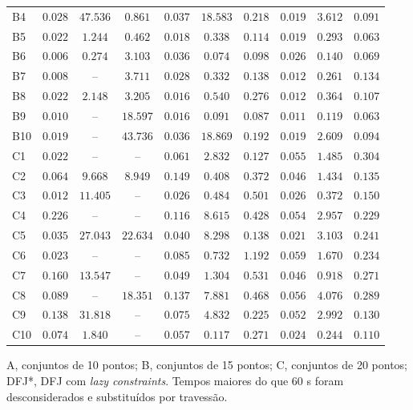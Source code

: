 \begin{table}
\begin{threeparttable}
\begin{tabular}{lccccccccc}
B4 & $\mathbf{0.028}$ & $47.536$ & $0.861$ & $\mathbf{0.037}$ & $18.583$ & $0.218$ & $\mathbf{0.019}$ & $3.612$ & $0.091$\\
B5 & $\mathbf{0.022}$ & $1.244$ & $0.462$ & $\mathbf{0.018}$ & $0.338$ & $0.114$ & $\mathbf{0.019}$ & $0.293$ & $0.063$\\
B6 & $\mathbf{0.006}$ & $0.274$ & $3.103$ & $\mathbf{0.036}$ & $0.074$ & $0.098$ & $\mathbf{0.026}$ & $0.140$ & $0.069$\\
B7 & $\mathbf{0.008}$ & -- & $3.711$ & $\mathbf{0.028}$ & $0.332$ & $0.138$ & $\mathbf{0.012}$ & $0.261$ & $0.134$\\
B8 & $\mathbf{0.022}$ & $2.148$ & $3.205$ & $\mathbf{0.016}$ & $0.540$ & $0.276$ & $\mathbf{0.012}$ & $0.364$ & $0.107$\\
B9 & $\mathbf{0.010}$ & -- & $18.597$ & $\mathbf{0.016}$ & $0.091$ & $0.087$ & $\mathbf{0.011}$ & $0.119$ & $0.063$\\
B10 & $\mathbf{0.019}$ & -- & $43.736$ & $\mathbf{0.036}$ & $18.869$ & $0.192$ & $\mathbf{0.019}$ & $2.609$ & $0.094$\\
C1 & $\mathbf{0.022}$ & -- & -- & $\mathbf{0.061}$ & $2.832$ & $0.127$ & $\mathbf{0.055}$ & $1.485$ & $0.304$\\
C2 & $\mathbf{0.064}$ & $9.668$ & $8.949$ & $\mathbf{0.149}$ & $0.408$ & $0.372$ & $\mathbf{0.046}$ & $1.434$ & $0.135$\\
C3 & $\mathbf{0.012}$ & $11.405$ & -- & $\mathbf{0.026}$ & $0.484$ & $0.501$ & $\mathbf{0.026}$ & $0.372$ & $0.150$\\
C4 & $\mathbf{0.226}$ & -- & -- & $\mathbf{0.116}$ & $8.615$ & $0.428$ & $\mathbf{0.054}$ & $2.957$ & $0.229$\\
C5 & $\mathbf{0.035}$ & $27.043$ & $22.634$ & $\mathbf{0.040}$ & $8.298$ & $0.138$ & $\mathbf{0.021}$ & $3.103$ & $0.241$\\
C6 & $\mathbf{0.023}$ & -- & -- & $\mathbf{0.085}$ & $0.732$ & $1.192$ & $\mathbf{0.059}$ & $1.670$ & $0.234$\\
C7 & $\mathbf{0.160}$ & $13.547$ & -- & $\mathbf{0.049}$ & $1.304$ & $0.531$ & $\mathbf{0.046}$ & $0.918$ & $0.271$\\
C8 & $\mathbf{0.089}$ & -- & $18.351$ & $\mathbf{0.137}$ & $7.881$ & $0.468$ & $\mathbf{0.056}$ & $4.076$ & $0.289$\\
C9 & $\mathbf{0.138}$ & $31.818$ & -- & $\mathbf{0.075}$ & $4.832$ & $0.225$ & $\mathbf{0.052}$ & $2.992$ & $0.130$\\
C10 & $\mathbf{0.074}$ & $1.840$ & -- & $\mathbf{0.057}$ & $0.117$ & $0.271$ & $\mathbf{0.024}$ & $0.244$ & $0.110$\\
\bottomrule
\end{tabular}
\begin{tablenotes}
\item A, conjuntos de 10 pontos; B, conjuntos de 15 pontos; C, conjuntos de 20 pontos; DFJ*, DFJ com \emph{lazy constraints}. Tempos maiores do que 60 s foram desconsiderados e substituídos por travessão.
\end{tablenotes}
\end{threeparttable}
\end{table}

